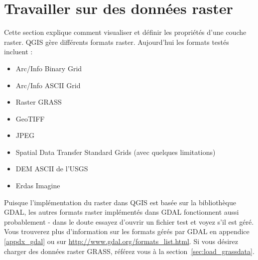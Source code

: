 
\section{Travailler sur des données raster}\label{label_raster}


Cette section explique comment visualiser et définir les propriétés d'une couche
raster. QGIS gère différents formats raster. Aujourd'hui les formats testés
incluent :
\begin{itemize}
\item Arc/Info Binary Grid
\item Arc/Info ASCII Grid
\item Raster GRASS
\item GeoTIFF
\item JPEG
\item Spatial Data Transfer Standard Grids (avec quelques limitations)
\item DEM ASCII de l'USGS
\item Erdas Imagine
\end{itemize}

Puisque l'implémentation du raster dans QGIS est basée sur la bibliothèque
GDAL, les autres formats raster implémentés dans GDAL fonctionnent aussi
probablement - dans le doute essayez d'ouvrir un fichier test et voyez s'il est
géré. Vous trouverez plus d'information sur les formats gérés par GDAL  en
appendice \ref{appdx_gdal}  ou sur
\url{http://www.gdal.org/formats_list.html}. Si vous désirez charger des
données raster GRASS, référez vous à la section~\ref{sec:load_grassdata}.

